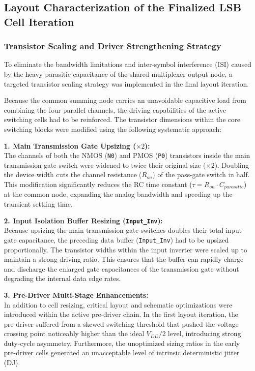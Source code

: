 \subsection{Layout Characterization of the Finalized LSB Cell Iteration}
\label{subsec:lsb_layout_final_iteration}

\subsubsection{Transistor Scaling and Driver Strengthening Strategy}

To eliminate the bandwidth limitations and inter-symbol interference (ISI) caused by the heavy parasitic capacitance of the shared multiplexer output node, a targeted transistor scaling strategy was implemented in the final layout iteration. 

Because the common summing node carries an unavoidable capacitive load from combining the four parallel channels, the driving capabilities of the active switching cells had to be reinforced. The transistor dimensions within the core switching blocks were modified using the following systematic approach:

\textbf{1. Main Transmission Gate Upsizing ($\times2$):} \\
The channels of both the NMOS (\texttt{N0}) and PMOS (\texttt{P0}) transistors inside the main transmission gate switch were widened to twice their original size ($\times2$). Doubling the device width cuts the channel resistance ($R_{on}$) of the pass-gate switch in half. This modification significantly reduces the RC time constant ($\tau = R_{on} \cdot C_{parasitic}$) at the common node, expanding the analog bandwidth and speeding up the transient settling time.

\textbf{2. Input Isolation Buffer Resizing (\texttt{Input\_Inv}):} \\
Because upsizing the main transmission gate switches doubles their total input gate capacitance, the preceding data buffer (\texttt{Input\_Inv}) had to be upsized proportionally. The transistor widths within the input inverter were scaled up to maintain a strong driving ratio. This ensures that the buffer can rapidly charge and discharge the enlarged gate capacitances of the transmission gate without degrading the internal data edge rates.

\textbf{3. Pre-Driver Multi-Stage Enhancements:} \\
In addition to cell resizing, critical layout and schematic optimizations were introduced within the active pre-driver chain. In the first layout iteration, the pre-driver suffered from a skewed switching threshold that pushed the voltage crossing point noticeably higher than the ideal $V_{DD}/2$ level, introducing strong duty-cycle asymmetry. Furthermore, the unoptimized sizing ratios in the early pre-driver cells generated an unacceptable level of intrinsic deterministic jitter (DJ). 

